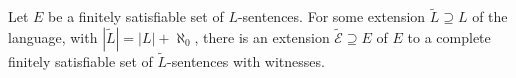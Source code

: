 Let $E$ be a finitely satisfiable set of $L$-sentences. For some extension $\tilde{L} \supseteq L$ of the language, with $|\tilde{L}| = |L| + \aleph_0$, there is an extension $\tilde{\mathcal{E}} \supseteq E$ of $E$ to a complete finitely satisfiable set of $\tilde{L}$-sentences with witnesses.
